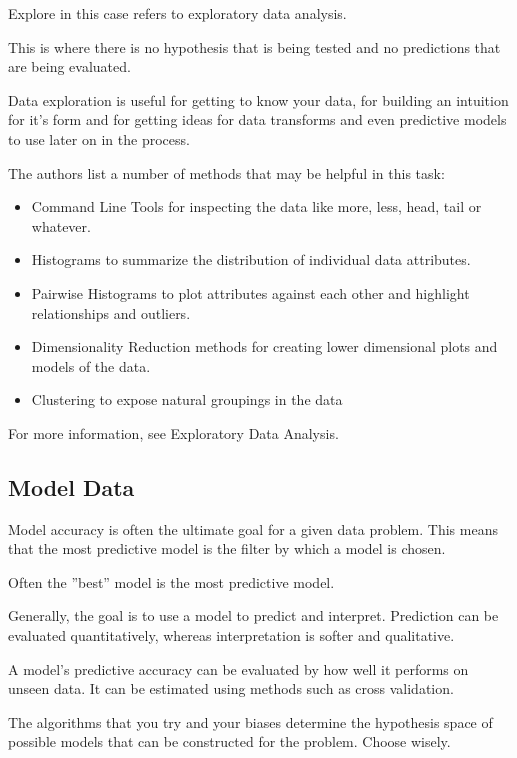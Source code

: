 \documentclass[11pt]{article}
\begin{document}
    Explore in this case refers to exploratory data analysis.

    This is where there is no hypothesis that is being tested and no predictions that are being evaluated.

    Data exploration is useful for getting to know your data, for building an intuition for it's form and for getting ideas for data transforms and even predictive models to use later on in the process.

    The authors list a number of methods that may be helpful in this task:

    \begin{itemize}
        \item Command Line Tools for inspecting the data like more, less, head, tail or whatever.
        \item Histograms to summarize the distribution of individual data attributes.
        \item Pairwise Histograms to plot attributes against each other and highlight relationships and outliers.
        \item Dimensionality Reduction methods for creating lower dimensional plots and models of the data.
        \item Clustering to expose natural groupings in the data
    \end{itemize}

    For more information, see Exploratory Data Analysis.

    \subsection{Model Data} \label{subsec:model}

    Model accuracy is often the ultimate goal for a given data problem.
    This means that the most predictive model is the filter by which a model is chosen.

    Often the ''best'' model is the most predictive model.

    Generally, the goal is to use a model to predict and interpret.
    Prediction can be evaluated quantitatively, whereas interpretation is softer and qualitative.

    A model's predictive accuracy can be evaluated by how well it performs on unseen data.
    It can be estimated using methods such as cross validation.

    The algorithms that you try and your biases determine the hypothesis space of possible models that can be constructed for the problem.
    Choose wisely.
\end{document}
